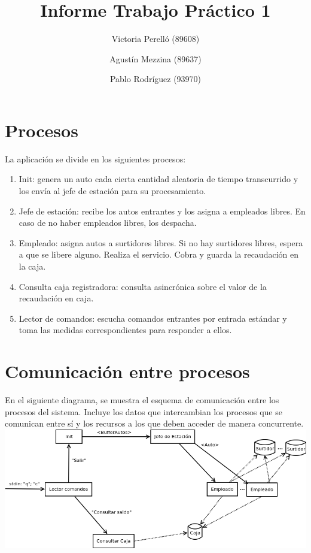 \documentclass{article}
\begin{document}
\title{Informe Trabajo Práctico 1}
\author{Victoria Perelló (89608)\\
        \and
        Agustín Mezzina (89637)\\
	\and
        Pablo Rodríguez (93970)}
\maketitle

\section{Procesos}
La aplicación se divide en los siguientes procesos:
\begin{enumerate}
	\item Init: genera un auto cada cierta cantidad aleatoria de tiempo transcurrido y los envía al jefe de estación para su procesamiento.
	\item Jefe de estación: recibe los autos entrantes y los asigna a empleados libres. En caso de no haber empleados libres, los despacha.
	\item Empleado: asigna autos a surtidores libres. Si no hay surtidores libres, espera a que se libere alguno. Realiza el servicio. Cobra y guarda la recaudación en la caja.
	\item Consulta caja registradora: consulta asincrónica sobre el valor de la recaudación en caja.
	\item Lector de comandos: escucha comandos entrantes por entrada estándar y toma las medidas correspondientes para responder a ellos.
\end{enumerate}

\section{Comunicación entre procesos}
En el siguiente diagrama, se muestra el esquema de comunicación entre los procesos del sistema. Incluye los datos que intercambian los procesos que se comunican entre sí y los recursos a los que deben acceder de manera concurrente.
\\[1\baselineskip]
\includegraphics[width=\textwidth]{overview}
\end{document}
